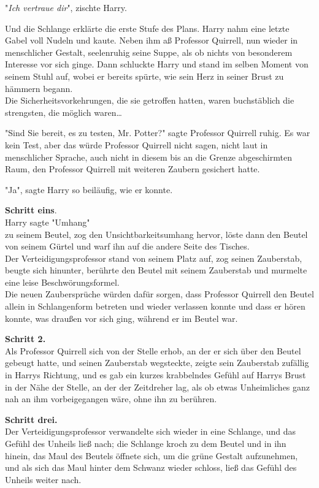{"\emph{Ich vertraue dir}", zischte Harry.

Und die Schlange erklärte die erste Stufe des Plans. Harry nahm eine letzte Gabel voll Nudeln und kaute. Neben ihm aß Professor Quirrell, nun wieder in menschlicher Gestalt, seelenruhig seine Suppe, als ob nichts von besonderem Interesse vor sich ginge. Dann schluckte Harry und stand im selben Moment von seinem Stuhl auf, wobei er bereits spürte, wie sein Herz in seiner Brust zu hämmern begann.\\ Die Sicherheitsvorkehrungen, die sie getroffen hatten, waren buchstäblich die strengsten, die möglich waren…

"Sind Sie bereit, es zu testen, Mr. Potter?" sagte Professor Quirrell ruhig. Es war kein Test, aber das würde Professor Quirrell nicht sagen, nicht laut in menschlicher Sprache, auch nicht in diesem bis an die Grenze abgeschirmten Raum, den Professor Quirrell mit weiteren Zaubern gesichert hatte.

"Ja", sagte Harry so beiläufig, wie er konnte.

\textbf{Schritt eins}.\\ Harry sagte "Umhang"\\ zu seinem Beutel, zog den Unsichtbarkeitsumhang hervor, löste dann den Beutel von seinem Gürtel und warf ihn auf die andere Seite des Tisches.\\ Der Verteidigungsprofessor stand von seinem Platz auf, zog seinen Zauberstab, beugte sich hinunter, berührte den Beutel mit seinem Zauberstab und murmelte eine leise Beschwörungsformel.\\ Die neuen Zaubersprüche würden dafür sorgen, dass Professor Quirrell den Beutel allein in Schlangenform betreten und wieder verlassen konnte und dass er hören konnte, was draußen vor sich ging, während er im Beutel war.

\textbf{Schritt 2.}\\ Als Professor Quirrell sich von der Stelle erhob, an der er sich über den Beutel gebeugt hatte, und seinen Zauberstab wegsteckte, zeigte sein Zauberstab zufällig in Harrys Richtung, und es gab ein kurzes krabbelndes Gefühl auf Harrys Brust in der Nähe der Stelle, an der der Zeitdreher lag, als ob etwas Unheimliches ganz nah an ihm vorbeigegangen wäre, ohne ihn zu berühren.

\textbf{Schritt drei.}\\ Der Verteidigungsprofessor verwandelte sich wieder in eine Schlange, und das Gefühl des Unheils ließ nach; die Schlange kroch zu dem Beutel und in ihn hinein, das Maul des Beutels öffnete sich, um die grüne Gestalt aufzunehmen, und als sich das Maul hinter dem Schwanz wieder schloss, ließ das Gefühl des Unheils weiter nach.

}
